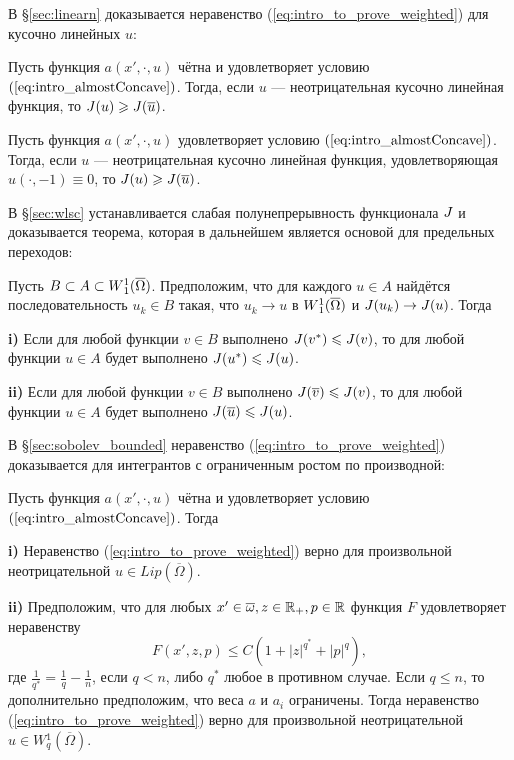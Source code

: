 В \S\ref{sec:linearn} доказывается неравенство (\ref{eq:intro_to_prove_weighted}) для кусочно линейных $u$:

\begin{lm}
Пусть функция $a(x', \cdot, u)$ чётна и удовлетворяет условию $(\ref{eq:intro_almostConcave})$.
Тогда, если $u$ --- неотрицательная кусочно линейная функция, то $\IWg( u ) \ge \IWg( \mon{u} )$.
\end{lm}

\begin{lm}
Пусть функция $a(x', \cdot, u)$ удовлетворяет условию $(\ref{eq:intro_almostConcave})$.
Тогда, если $u$ --- неотрицательная кусочно линейная функция, удовлетворяющая $u(\cdot, -1) \equiv 0$,
то $\IWg( u ) \ge \IWg( \mon{u} )$.
\end{lm}

В \S\ref{sec:wlsc} устанавливается слабая полунепрерывность функционала $J$
и доказывается теорема, которая в дальнейшем является основой для предельных переходов:

\begin{thm}
Пусть $B \subset A \subset \W(\overline{\Omega})$.
Предположим, что для каждого $u \in A$ найдётся последовательность $u_k \in B$ такая,
что $u_k \to u$ в $\W(\overline{\Omega})$ и $J( u_k ) \to J( u )$.
Тогда

\textbf{\textup{i)}}
Если для любой функции $v \in B$ выполнено $J( {v^*} ) \leqslant J( v )$,
то для любой функции $u \in A$ будет выполнено $J( {u^*} ) \leqslant J( u )$.

\textbf{\textup{ii)}}
Если для любой функции $v \in B$ выполнено $\IWg( \mon{v} ) \le \IWg( v )$,
то для любой функции $u \in A$ будет выполнено $\IWg( \mon{u} ) \le \IWg( u )$.
\end{thm}

В \S\ref{sec:sobolev_bounded} неравенство (\ref{eq:intro_to_prove_weighted}) доказывается для интегрантов с ограниченным ростом по производной:

\begin{thm}
Пусть функция $a(x', \cdot, u)$ чётна и удовлетворяет условию $(\ref{eq:intro_almostConcave})$.
Тогда

\textbf{\textup{i)}} Неравенство (\ref{eq:intro_to_prove_weighted}) верно для произвольной неотрицательной $u \in Lip(\overline{\Omega})$.

\textbf{\textup{ii)}} Предположим, что для любых $x' \in \overline{\omega}, z \in \Real_+, p \in \Real$
функция $F$ удовлетворяет неравенству
$$F( x', z, p ) \le C ( 1 + |z|^{q^*} + |p|^q ),$$
где $\frac{1}{q^*} = \frac{1}{q} - \frac{1}{n}$, если $q < n$, либо $q^*$ любое в противном случае.
Если $q \le n$, то дополнительно предположим, что веса $a$ и $a_i$ ограничены.
Тогда неравенство (\ref{eq:intro_to_prove_weighted}) верно для произвольной неотрицательной $u \in W{}^1_q(\overline{\Omega})$.
\end{thm}

